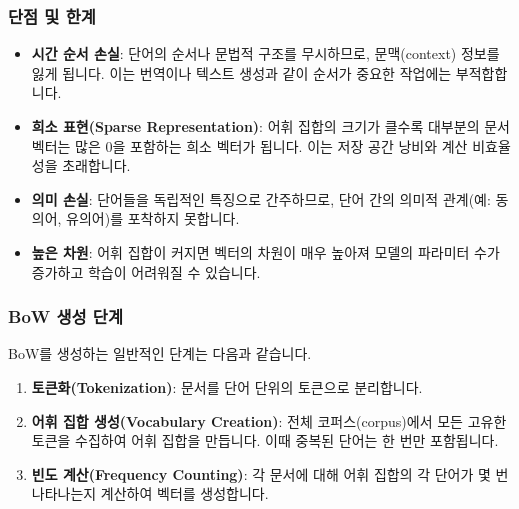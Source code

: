 \documentclass[11pt,a4paper]{article}
\begin{document}
\subsubsection{단점 및 한계}
\begin{itemize}
    \item \textbf{시간 순서 손실}: 단어의 순서나 문법적 구조를 무시하므로, 문맥(context) 정보를 잃게 됩니다. 이는 번역이나 텍스트 생성과 같이 순서가 중요한 작업에는 부적합합니다.
    \item \textbf{희소 표현(Sparse Representation)}: 어휘 집합의 크기가 클수록 대부분의 문서 벡터는 많은 0을 포함하는 희소 벡터가 됩니다. 이는 저장 공간 낭비와 계산 비효율성을 초래합니다.
    \item \textbf{의미 손실}: 단어들을 독립적인 특징으로 간주하므로, 단어 간의 의미적 관계(예: 동의어, 유의어)를 포착하지 못합니다.
    \item \textbf{높은 차원}: 어휘 집합이 커지면 벡터의 차원이 매우 높아져 모델의 파라미터 수가 증가하고 학습이 어려워질 수 있습니다.
\end{itemize}

\subsubsection{BoW 생성 단계}
BoW를 생성하는 일반적인 단계는 다음과 같습니다.
\begin{enumerate}
    \item \textbf{토큰화(Tokenization)}: 문서를 단어 단위의 토큰으로 분리합니다.
    \item \textbf{어휘 집합 생성(Vocabulary Creation)}: 전체 코퍼스(corpus)에서 모든 고유한 토큰을 수집하여 어휘 집합을 만듭니다. 이때 중복된 단어는 한 번만 포함됩니다.
    \item \textbf{빈도 계산(Frequency Counting)}: 각 문서에 대해 어휘 집합의 각 단어가 몇 번 나타나는지 계산하여 벡터를 생성합니다.
\end{enumerate}
\end{document}
